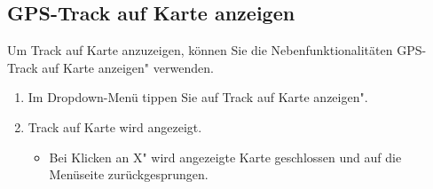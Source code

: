\documentclass{article}
\begin{document}
\subsection{GPS-Track auf Karte anzeigen}
	Um Track auf Karte anzuzeigen, können Sie die Nebenfunktionalitäten \glqq GPS-Track auf Karte anzeigen" verwenden.\\
	\begin{enumerate}
		\item Im Dropdown-Menü tippen Sie auf \glqq Track auf Karte anzeigen".
		\item Track auf Karte wird angezeigt.
			\begin{itemize}
				\item Bei Klicken an \glqq X" wird angezeigte Karte geschlossen und auf die Menüseite zurückgesprungen.
			\end{itemize}
	\end{enumerate}
\end{document}
